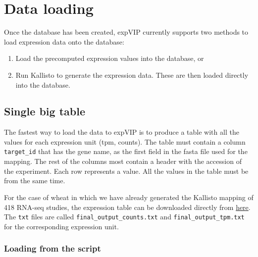 \section{Data loading}\label{data-loading}

Once the database has been created, expVIP currently supports two
methods to load expression data onto the database:

\begin{enumerate}
\def\labelenumi{\arabic{enumi}.}
\itemsep1pt\parskip0pt
\item
  Load the precomputed expression values into the database, or
\item
  Run Kallisto to generate the expression data. These are then loaded
  directly into the database.
\end{enumerate}

\subsection{Single big table}\label{single-big-table}

The fastest way to load the data to expVIP is to produce a table with
all the values for each expression unit (tpm, counts). The table must
contain a column \lstinline!target_id! that has the gene name, as the
first field in the fasta file used for the mapping. The rest of the
columns most contain a header with the accession of the experiment. Each
row represents a value. All the values in the table must be from the
same time.

For the case of wheat in which we have already generated the Kallisto
mapping of 418 RNA-seq studies, the expression table can be downloaded
directly from
\href{https://www.dropbox.com/sh/n15tpsqj92wfn8u/AABivEEUj4sRd9tG830WnSi4a?dl=0}{here}.
The \lstinline!txt! files are called \lstinline!final_output_counts.txt!
and \lstinline!final_output_tpm.txt! for the corresponding expression
unit.

\subsubsection{Loading from the script}\label{loading-from-the-script}

